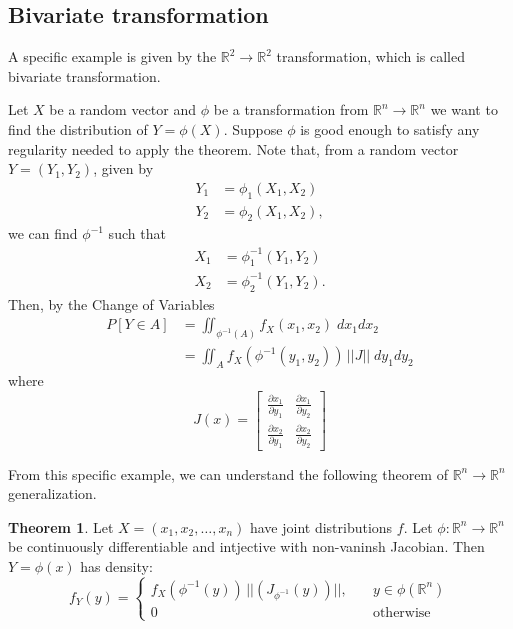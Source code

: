 \documentclass[twoside]{article}
\theoremstyle{definition}
\newtheorem{theorem}{Theorem}[section]
\theoremstyle{remark}
\theoremstyle{remark}
\begin{document}
\subsection{Bivariate transformation}
A specific example is given by the $\mathbb{R}^2 \rightarrow \mathbb{R}^2$ transformation,
which is called bivariate transformation.

Let $X$ be a random vector and $\phi$ be a transformation from $\mathbb{R}^n \rightarrow \mathbb{R}^n$
we want to find the distribution of $Y=\phi(X)$. Suppose $\phi$ is good enough
to satisfy any regularity needed to apply the theorem.
Note that, from a random vector $Y = (Y_1, Y_2)$, given by
\begin{equation}
  \begin{split}
    Y_1 &= \phi_1(X_1, X_2) \\
    Y_2 &= \phi_2(X_1, X_2),
  \end{split}
\end{equation}
we can find $\phi^{-1}$ such that
\begin{equation}
  \begin{split}
    X_1 &= \phi^{-1}_1 (Y_1, Y_2) \\
    X_2 &= \phi^{-1}_2 (Y_1, Y_2).
  \end{split}
\end{equation}
Then, by the Change of Variables
\begin{equation}
  \begin{split}
    P[Y \in A]
    &= \iint_{\phi^{-1}(A)} f_X(x_1, x_2) \; dx_1 dx_2 \\
    &= \iint_{A} f_X(\phi^{-1}(y_1, y_2)) \, ||J|| \; dy_1 dy_2
  \end{split}
\end{equation}
where
\begin{equation}
  J(x) =
    \begin{bmatrix}
      \frac{\partial x_1}{\partial y_1} & \frac{\partial x_1}{\partial y_2} \\
      \frac{\partial x_2}{\partial y_1} & \frac{\partial x_2}{\partial y_2}
    \end{bmatrix}
\end{equation}

From this specific example, we can understand the following theorem of
$\mathbb{R}^n \rightarrow \mathbb{R}^n$ generalization.
\begin{theorem}
  Let $X = (x_1, x_2, \ldots, x_n)$ have joint distributions $f$. Let $\phi:
  \mathbb{R}^n \rightarrow \mathbb{R}^n$ be continuously differentiable and
  intjective with non-vaninsh Jacobian. Then $Y = \phi(x)$ has density:
  \begin{equation}
    f_Y(y) = \left\{
      \begin{array}{ll}
        f_X(\phi^{-1}(y)) \, ||(J_{\phi^{-1}}(y))||, &\quad y \in \phi(\mathbb{R}^n) \\
        0                                            &\quad \textrm{otherwise}
      \end{array}
      \right.
  \end{equation}
\end{theorem}
\end{document}
